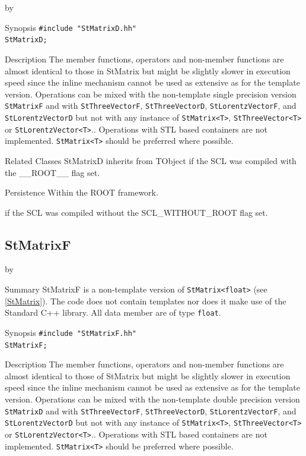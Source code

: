 \documentclass[twoside]{article}
\newcommand{\name}[1]{\textsf{#1}}%
\newcommand{\entrylabel}[1]{\mbox{\textbf{{#1}}}\hfil}%
\newenvironment{entry}
{\begin{list}{}%
    {\renewcommand{\makelabel}{\entrylabel}%
     \setlength{\labelwidth}{90pt}%
     \setlength{\leftmargin}{\labelwidth}
     \advance\leftmargin by \labelsep%
      }%
    }%
  {\end{list}}
\newcommand{\Entrylabel}[1]%
{\raisebox{0pt}[1ex][0pt]{\makebox[\labelwidth][l]%
    {\parbox[t]{\labelwidth}{\hspace{0pt}\textbf{{#1}}}}}}
\newenvironment{Entry}%
{\renewcommand{\entrylabel}{\Entrylabel}\begin{entry}}%
  {\end{entry}}
\begin{document}
\begin{description}
\begin{Entry}
\item[Synopsis]
    \verb+#include "StMatrixD.hh"+ \\
    \verb+StMatrixD;+
    
    
\item[Description]       
    The member functions, operators and non-member functions are almost identical
    to those in StMatrix but might be slightly slower in execution speed
    since the inline mechanism cannot be used as extensive as for the template
    version. Operations can be mixed with the non-template single precision version
    \texttt{StMatrixF} and with \texttt{StThreeVectorF}, \texttt{StThreeVectorD},
    \texttt{StLorentzVectorF}, and \texttt{StLorentzVectorD}
    but not with any instance of \verb+StMatrix<T>+, \verb+StThreeVector<T>+ or
    \verb+StLorentzVector<T>+..
    Operations with STL based containers are not implemented.
    \verb+StMatrix<T>+ should be preferred where possible.

\item[Related Classes]
    StMatrixD inherits from TObject 
    if the SCL was compiled with the \name{\_\_ROOT\_\_} flag set.

\item[Persistence]
    Within the ROOT framework.


\end{Entry}

%
    if the SCL was compiled without the \name{SCL\_WITHOUT\_ROOT} flag set.
\subsection{StMatrixF } \label{StMatrixF}
\begin{Entry}
\item[Summary]
    StMatrixF is a non-template version of \verb+StMatrix<float>+
    (see \ref{StMatrix}). The code does not contain templates nor
    does it make use of the Standard C++ library. All data member are of
    type \texttt{float}.
    
\item[Synopsis]
    \verb+#include "StMatrixF.hh"+ \\
    \verb+StMatrixF;+
    
    
\item[Description]       
    The member functions, operators and non-member functions are almost identical
    to those of StMatrix but might be slightly slower in execution speed
    since the inline mechanism cannot be used as extensive as for the template
    version. Operations can be mixed with the non-template double precision version
    \texttt{StMatrixD} and with \texttt{StThreeVectorF}, \texttt{StThreeVectorD},
    \texttt{StLorentzVectorF}, and \texttt{StLorentzVectorD}
    but not with any instance of \verb+StMatrix<T>+, \verb+StThreeVector<T>+ or
    \verb+StLorentzVector<T>+..
    Operations with STL based containers are not implemented.
    \verb+StMatrix<T>+ should be preferred where possible.
    

\end{Entry}
\end{description}
\end{document}
